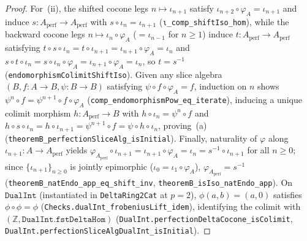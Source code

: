 \documentclass[10pt,twoside,openright]{book}
\theoremstyle{crmplain}
\theoremstyle{crmdef}
\theoremstyle{crmremark}
\begin{document}
\begin{proof}
For~(ii), the shifted cocone legs $n \mapsto \iota_{n+1}$ satisfy $\iota_{n+2} \circ \varphi_A = \iota_{n+1}$ and induce $s : A_{\mathrm{perf}} \to A_{\mathrm{perf}}$ with $s \circ \iota_n = \iota_{n+1}$ (\texttt{ι\_\allowbreak comp\_\allowbreak shiftIso\_\allowbreak hom}), while the backward cocone legs $n \mapsto \iota_n \circ \varphi_A$ ($= \iota_{n-1}$ for $n \ge 1$) induce $t : A_{\mathrm{perf}} \to A_{\mathrm{perf}}$ satisfying $t \circ s \circ \iota_n = t \circ \iota_{n+1} = \iota_{n+1} \circ \varphi_A = \iota_n$ and $s \circ t \circ \iota_n = s \circ \iota_n \circ \varphi_A = \iota_{n+1} \circ \varphi_A = \iota_n$, so $t = s^{-1}$ (\texttt{endomorphismColimitShiftIso}). Given any slice algebra $(B, f : A \to B, \psi : B \to B)$ satisfying $\psi \circ f \circ \varphi_A = f$, induction on $n$ shows $\psi^n \circ f = \psi^{n+1} \circ f \circ \varphi_A$ (\texttt{comp\_\allowbreak endomorphismPow\_\allowbreak eq\_\allowbreak iterate}), inducing a unique colimit morphism $h : A_{\mathrm{perf}} \to B$ with $h \circ \iota_n = \psi^n \circ f$ and $h \circ s \circ \iota_n = h \circ \iota_{n+1} = \psi^{n+1} \circ f = \psi \circ h \circ \iota_n$, proving~(a) (\texttt{theoremB\_\allowbreak perfectionSliceAlg\_\allowbreak isInitial}). Finally, naturality of $\varphi$ along $\iota_{n+1} : A \to A_{\mathrm{perf}}$ yields $\varphi_{A_{\mathrm{perf}}} \circ \iota_{n+1} = \iota_{n+1} \circ \varphi_A = \iota_n = s^{-1} \circ \iota_{n+1}$ for all $n \ge 0$; since $\{\iota_{n+1}\}_{n \ge 0}$ is jointly epimorphic ($\iota_0 = \iota_1 \circ \varphi_A$), $\varphi_{A_{\mathrm{perf}}} = s^{-1}$ (\texttt{theoremB\_\allowbreak natEndo\_\allowbreak app\_\allowbreak eq\_\allowbreak shift\_\allowbreak inv}, \texttt{theoremB\_\allowbreak isIso\_\allowbreak natEndo\_\allowbreak app}). On $\mathtt{DualInt}$ (instantiated in \texttt{DeltaRing2Cat} at $p = 2$), $\phi(a, b) = (a, 0)$ satisfies $\phi \circ \phi = \phi$ (\texttt{Checks.\allowbreak dualInt\_\allowbreak frobeniusLift\_\allowbreak idem}), identifying the colimit with $(\mathbb{Z}, \mathtt{DualInt.fstDeltaHom})$ (\texttt{DualInt.\allowbreak perfectionDeltaCocone\_\allowbreak isColimit}, \texttt{DualInt.\allowbreak perfectionSliceAlgDualInt\_\allowbreak isInitial}).
\end{proof}
\end{document}
